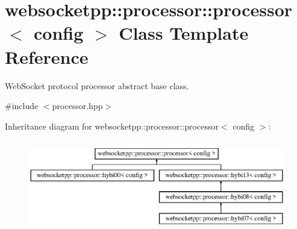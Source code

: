 \hypertarget{classwebsocketpp_1_1processor_1_1processor}{}\section{websocketpp\+:\+:processor\+:\+:processor$<$ config $>$ Class Template Reference}
\label{classwebsocketpp_1_1processor_1_1processor}


Web\+Socket protocol processor abstract base class.  




{\ttfamily \#include $<$processor.\+hpp$>$}

Inheritance diagram for websocketpp\+:\+:processor\+:\+:processor$<$ config $>$\+:\begin{figure}[H]
\begin{center}
\leavevmode
\includegraphics[height=4.000000cm]{classwebsocketpp_1_1processor_1_1processor}
\end{center}
\end{figure}
